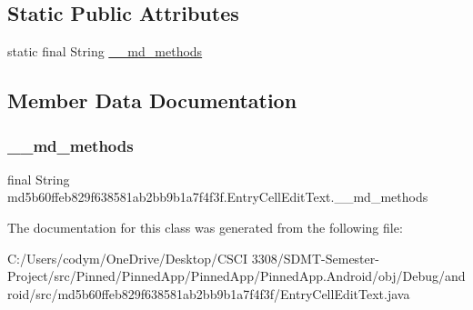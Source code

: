 \subsection*{Static Public Attributes}
\begin{DoxyCompactItemize}
\item 
static final String \hyperlink{classmd5b60ffeb829f638581ab2bb9b1a7f4f3f_1_1_entry_cell_edit_text_a12054a03c17af4ab15a7d12108ce682a}{\+\_\+\+\_\+md\+\_\+methods}
\end{DoxyCompactItemize}


\subsection{Member Data Documentation}
\mbox{\label{classmd5b60ffeb829f638581ab2bb9b1a7f4f3f_1_1_entry_cell_edit_text_a12054a03c17af4ab15a7d12108ce682a}} 
\subsubsection{\texorpdfstring{\+\_\+\+\_\+md\+\_\+methods}{\_\_md\_methods}}
{\footnotesize\ttfamily final String md5b60ffeb829f638581ab2bb9b1a7f4f3f.\+Entry\+Cell\+Edit\+Text.\+\_\+\+\_\+md\+\_\+methods\hspace{0.3cm}{\ttfamily [static]}}



The documentation for this class was generated from the following file\+:\begin{DoxyCompactItemize}
\item 
C\+:/\+Users/codym/\+One\+Drive/\+Desktop/\+C\+S\+C\+I 3308/\+S\+D\+M\+T-\/\+Semester-\/\+Project/src/\+Pinned/\+Pinned\+App/\+Pinned\+App/\+Pinned\+App.\+Android/obj/\+Debug/android/src/md5b60ffeb829f638581ab2bb9b1a7f4f3f/Entry\+Cell\+Edit\+Text.\+java\end{DoxyCompactItemize}
